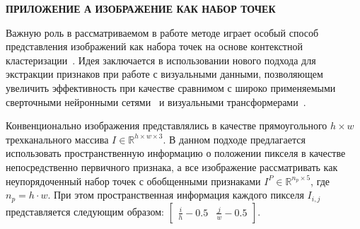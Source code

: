 \newpage
\begin{center}
  \textbf{\large ПРИЛОЖЕНИЕ А ИЗОБРАЖЕНИЕ КАК НАБОР ТОЧЕК}
\end{center}

\label{sec:set_of_points}
Важную роль в рассматриваемом в работе методе играет особый способ представления изображений
как набора точек на основе контекстной кластеризации~\cite{ma2023image}. Идея заключается
в использовании нового подхода для экстракции признаков при работе с визуальными данными,
позволяющем увеличить эффективность при качестве сравнимом с широко применяемыми
сверточными нейронными сетями~\cite{simonyan2014very} и визуальными трансформерами~\cite{dosovitskiy2020image}.

Конвенционально изображения представлялись в качестве прямоугольного $h\times w$ трехканального массива
$I \in \mathbb{R}^{h\times w \times 3}$. В данном подходе предлагается использовать пространственную
информацию о положении пикселя в качестве непосредственно первичного признака, а все изображение
рассматривать как неупорядоченный набор точек с обобщенными признаками $I^P \in \mathbb{R}^{n_p \times 5}$,
где $n_p = h\cdot w$. При этом пространственная информация каждого пикселя $I_{i,j}$
представляется следующим образом: $\begin{bmatrix} \frac{i}{h}-0.5 & \frac{j}{w}-0.5 \end{bmatrix}$.


